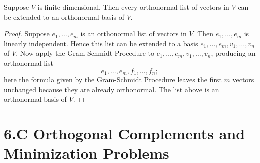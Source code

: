 \documentclass[11pt]{article}
\begin{document}
    Suppose $V$ is finite-dimensional. Then every orthonormal list of vectors in $V$ can be extended to an orthonormal basis of $V$.

    \begin{proof}
        Suppose \(e_1, \dots, e_m\) is an orthonormal list of vectors in $V$. Then \(e_1, \dots, e_m\) is linearly independent. Hence this list can be extended to a basis \(e_1, \dots, e_m, v_1, \dots, v_n\) of $V$. Now apply the Gram-Schmidt Procedure to \(e_1, \dots, e_m, v_1, \dots, v_n\), producing an orthonormal list \[e_1, \dots, e_m, f_1, \dots, f_n;\] here the formula given by the Gram-Schmidt Procedure leaves the first $m$ vectors unchanged because they are already orthonormal. The list above is an orthonormal basis of $V$. 
    \end{proof}
    \section{6.C Orthogonal Complements and Minimization Problems}

    
 
\end{document}
